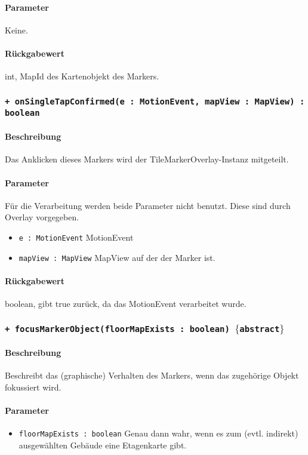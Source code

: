 \paragraph*{Parameter}
Keine.
\paragraph*{Rückgabewert}
int, MapId des Kartenobjekt des Markers.

\subsubsection*{\texttt{+ onSingleTapConfirmed(e : MotionEvent, mapView : MapView) : boolean}}%
\paragraph*{Beschreibung}
Das Anklicken dieses Markers wird der TileMarkerOverlay-Instanz mitgeteilt.
\paragraph*{Parameter}
Für die Verarbeitung werden beide Parameter nicht benutzt. Diese sind durch Overlay vorgegeben.
\begin{itemize}
    \item \texttt{e : MotionEvent} MotionEvent
    \item \texttt{mapView : MapView} MapView auf der der Marker ist.
\end{itemize}
\paragraph*{Rückgabewert}
boolean, gibt true zurück, da das MotionEvent verarbeitet wurde.

\subsubsection*{\texttt{+ focusMarkerObject(floorMapExists : boolean) $\lbrace$abstract$\rbrace$}}%
\paragraph*{Beschreibung}
Beschreibt das (graphische) Verhalten des Markers, wenn das zugehörige Objekt fokussiert wird.
\paragraph*{Parameter}
\begin{itemize}
    \item \texttt{floorMapExists : boolean} Genau dann wahr, wenn es zum (evtl. indirekt) ausgewählten Gebäude eine Etagenkarte gibt.
\end{itemize}
